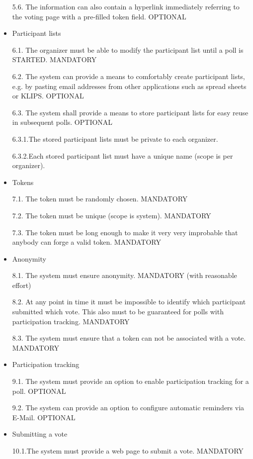 \begin{itemize}
5.6. The information can also contain a hyperlink immediately referring to the voting page with a
pre-filled token field. OPTIONAL


\item Participant lists


6.1. The organizer must be able to modify the participant list until a poll is STARTED. MANDATORY


6.2. The system can provide a means to comfortably create participant lists, e.g. by pasting
email addresses from other applications such as spread sheets or KLIPS. OPTIONAL


6.3. The system shall provide a means to store participant lists for easy reuse in subsequent
polls. OPTIONAL


6.3.1.The stored participant lists must be private to each organizer.


6.3.2.Each stored participant list must have a unique name (scope is per organizer).


\item Tokens


7.1. The token must be randomly chosen. MANDATORY


7.2. The token must be unique (scope is system). MANDATORY


7.3. The token must be long enough to make it very very improbable that anybody can forge a
valid token. MANDATORY


\item Anonymity


8.1. The system must ensure anonymity. MANDATORY (with reasonable effort)


8.2. At any point in time it must be impossible to identify which participant submitted which vote.
This also must to be guaranteed for polls with participation tracking. MANDATORY


8.3. The system must ensure that a token can not be associated with a vote. MANDATORY


\item Participation tracking


9.1. The system must provide an option to enable participation tracking for a poll. OPTIONAL


9.2. The system can provide an option to configure automatic reminders via E-Mail. OPTIONAL


\item Submitting a vote


10.1.The system must provide a web page to submit a vote. MANDATORY



\end{itemize}
